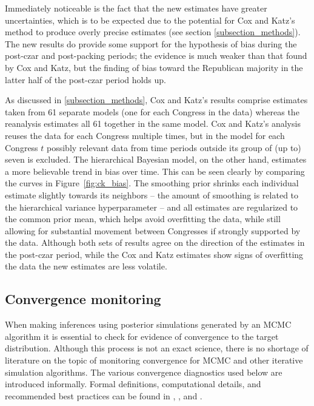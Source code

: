 Immediately noticeable is the fact that the new estimates have greater uncertainties, which is to be expected due to the potential for Cox and Katz's method to produce overly precise estimates  (see section \ref{subsection_methods}). The new results do provide some support for the hypothesis of bias during the post-czar and post-packing periods; the evidence is much weaker than that found by Cox and Katz, but the finding of bias toward the Republican majority in the latter half of the post-czar period holds up. 

As discussed in \ref{subsection_methods}, Cox and Katz's results comprise estimates taken from 61 separate models (one for each Congress in the data) whereas the reanalysis estimates all 61 together in the same model. Cox and Katz's analysis reuses the data for each Congress multiple times, but in the model for each Congress $t$ possibly relevant data from time periods outside its group of (up to) seven is excluded. The hierarchical Bayesian model, on the other hand, estimates a more believable trend in bias over time. This can be seen clearly by comparing the curves in Figure~\ref{fig:ck_bias}. The smoothing prior shrinks each individual estimate slightly towards its neighbors -- the amount of smoothing is related to the hierarchical variance hyperparameter -- and all estimates are regularized to the common prior mean, which helps avoid overfitting the data, while still allowing for substantial movement between Congresses if strongly supported by the data. Although both sets of results agree on the direction of the estimates in the post-czar period, while the Cox and Katz estimates show signs of overfitting the data the new estimates are less volatile. 


\subsection{Convergence monitoring}
\label{subsection_convergence}

When making inferences using posterior simulations generated by an MCMC algorithm it is essential to check for evidence of convergence to the target distribution. Although this process is not an exact science, there is no shortage of literature on the topic of monitoring convergence for MCMC and other iterative simulation algorithms. The various convergence diagnostics used below are introduced informally. Formal definitions, computational details, and recommended best practices can be found in , , and .

